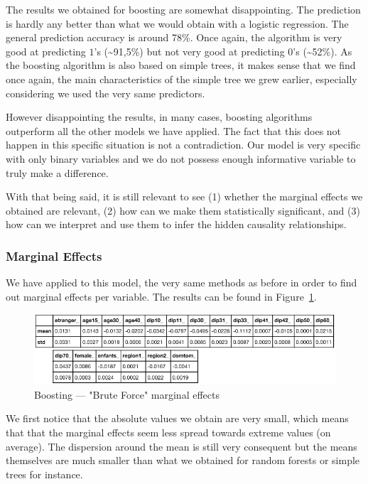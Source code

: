 The results we obtained for boosting are somewhat disappointing. The prediction is hardly any better than what we would obtain with a logistic regression. The general prediction accuracy is around 78\%. Once again, the algorithm is very good at predicting $1$’s (\textasciitilde91,5\%) but not very good at predicting $0$’s (\textasciitilde52\%). As the boosting algorithm is also based on simple trees, it makes sense that we find once again, the main characteristics of the simple tree we grew earlier, especially considering we used the very same predictors.

However disappointing the results, in many cases, boosting algorithms outperform all the other models we have applied. The fact that this does not happen in this specific situation is not a contradiction. Our model is very specific with only binary variables and we do not possess enough informative variable to truly make a difference.

With that being said, it is still relevant to see (1) whether the marginal effects we obtained are relevant, (2) how can we make them statistically significant, and (3) how can we interpret and use them to infer the hidden causality relationships.

\subsubsection{Marginal Effects}
We have applied to this model, the very same methods as before in order to find out marginal effects per variable. The results can be found in Figure~\ref{fig:boosting_brute_force}.

\begin{figure}
    \centering
    \includegraphics[scale=0.25]{img/boosting_brute_force.png}
    \caption{Boosting --- "Brute Force" marginal effects}
    \label{fig:boosting_brute_force}
\end{figure}

We first notice that the absolute values we obtain are very small, which means that that the marginal effects seem less spread towards extreme values (on average). The dispersion around the mean is still very consequent but the means themselves are much smaller than what we obtained for random forests or simple trees for instance.

